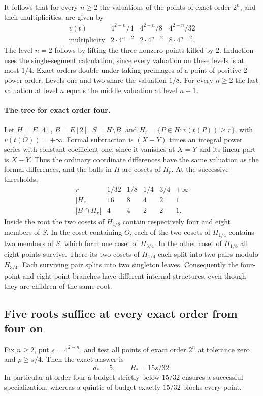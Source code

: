 It follows that for every $n\ge2$ the valuations of the points of exact order $2^n$, and their multiplicities, are given by
\[
\begin{array}{c|ccc}
v(t) & 4^{2-n}/4 & 4^{2-n}/8 & 4^{2-n}/32 \\
\hline
\text{multiplicity} & 2\cdot4^{n-2}&2\cdot4^{n-2}&8\cdot4^{n-2}.
\end{array}
\]
The level $n=2$ follows by lifting the three nonzero points killed by $2$. Induction uses the single-segment calculation, since every valuation on these levels is at most $1/4$. Exact orders double under taking preimages of a point of positive $2$-power order. Levels one and two share the valuation $1/8$. For every $n\ge2$ the last valuation at level $n$ equals the middle valuation at level $n+1$.

\paragraph{The tree for exact order four.}
Let $H=E[4]$, $B=E[2]$, $S=H\setminus B$, and $H_r=\{P\in H:v(t(P))\ge r\}$, with $v(t(O))=+\infty$. Formal subtraction is $(X-Y)$ times an integral power series with constant coefficient one, since it vanishes at $X=Y$ and its linear part is $X-Y$. Thus the ordinary coordinate differences have the same valuation as the formal differences, and the balls in $H$ are cosets of $H_r$. At the successive thresholds,
\[
\begin{array}{c|rrrrr}
r & 1/32 & 1/8 & 1/4 & 3/4 & +\infty\\
\hline
|H_r|       &16&8&4&2&1\\
|B\cap H_r| &4&4&2&2&1 .
\end{array}
\]
Inside the root the two cosets of $H_{1/8}$ contain respectively four and eight members of $S$. In the coset containing $O$, each of the two cosets of $H_{1/4}$ contains two members of $S$, which form one coset of $H_{3/4}$. In the other coset of $H_{1/8}$ all eight points survive. There its two cosets of $H_{1/4}$ each split into two pairs modulo $H_{3/4}$. Each surviving pair splits into two singleton leaves. Consequently the four-point and eight-point branches have different internal structures, even though they are children of the same root.

\subsection{Five roots suffice at every exact order from four on}
Fix $n\ge2$, put $s=4^{2-n}$, and test all points of exact order $2^n$
at tolerance zero and $\rho\ge s/4$. Then the exact answer is
\[
               \boxed{\ d_*=5,\qquad B_*=15s/32.\ }
\]
In particular at order four a budget strictly below $15/32$ ensures a
successful specialization, whereas a quintic of budget exactly $15/32$
blocks every point.

